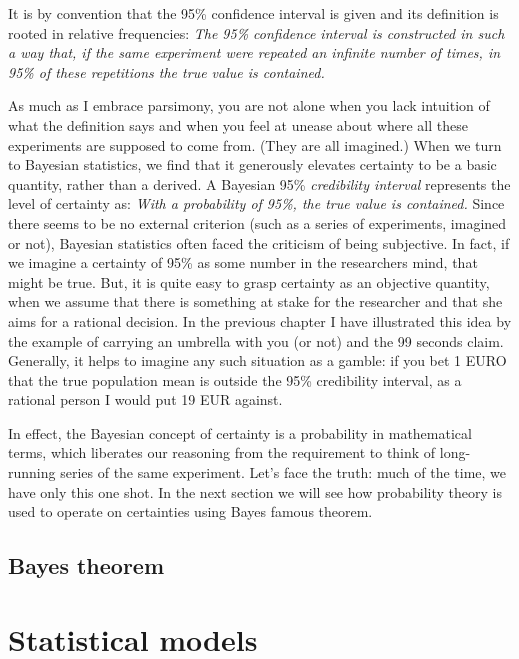 \documentclass[]{svmono}
\theoremstyle{definition}
\theoremstyle{definition}
\theoremstyle{definition}
\theoremstyle{remark}
\begin{document}
It is by convention that the 95\% confidence interval is given and its
definition is rooted in relative frequencies: \emph{The 95\% confidence
interval is constructed in such a way that, if the same experiment were
repeated an infinite number of times, in 95\% of these repetitions the
true value is contained.}

As much as I embrace parsimony, you are not alone when you lack
intuition of what the definition says and when you feel at unease about
where all these experiments are supposed to come from. (They are all
imagined.) When we turn to Bayesian statistics, we find that it
generously elevates certainty to be a basic quantity, rather than a
derived. A Bayesian 95\% \emph{credibility interval} represents the
level of certainty as: \emph{With a probability of 95\%, the true value
is contained.} Since there seems to be no external criterion (such as a
series of experiments, imagined or not), Bayesian statistics often faced
the criticism of being subjective. In fact, if we imagine a certainty of
95\% as some number in the researchers mind, that might be true. But, it
is quite easy to grasp certainty as an objective quantity, when we
assume that there is something at stake for the researcher and that she
aims for a rational decision. In the previous chapter I have illustrated
this idea by the example of carrying an umbrella with you (or not) and
the 99 seconds claim. Generally, it helps to imagine any such situation
as a gamble: if you bet 1 EURO that the true population mean is outside
the 95\% credibility interval, as a rational person I would put 19 EUR
against.

In effect, the Bayesian concept of certainty is a probability in
mathematical terms, which liberates our reasoning from the requirement
to think of long-running series of the same experiment. Let's face the
truth: much of the time, we have only this one shot. In the next section
we will see how probability theory is used to operate on certainties
using Bayes famous theorem.

\subsection{Bayes theorem}\label{bayes-theorem}

\section{Statistical models}\label{statistical-models}
\end{document}
